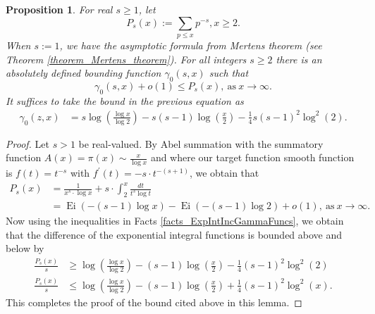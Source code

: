 \documentclass[11pt,reqno,a4letter]{article}
\numberwithin{figure}{section}
\numberwithin{table}{section}
\theoremstyle{plain}
\newtheorem{prop}[theorem]{Proposition}
\numberwithin{theorem}{section}
\theoremstyle{definition}
\newcommand{\NBRef}[1]{}
\begin{document}

\begin{prop} 
\label{cor_PartialSumsOfReciprocalsOfPrimePowers} 
For real $s \geq 1$, let 
\[
P_s(x) := \sum_{p \leq x} p^{-s}, x \geq 2. 
\]
When $s := 1$, we have the asymptotic formula from Mertens theorem 
(see Theorem \ref{theorem_Mertens_theorem}). 
For all integers $s \geq 2$ 
there is an absolutely defined bounding function $\gamma_0(s, x)$ such that 
\[
\gamma_0(s, x) + o(1) \leq P_s(x), \mathrm{\ as\ } x \rightarrow \infty. 
\] 
It suffices to take the bound in the previous equation as 
\begin{align*} 
\gamma_0(z, x) & = s\log\left(\frac{\log x}{\log 2}\right) - 
     s(s-1) \log\left(\frac{x}{2}\right) - 
     \frac{1}{4} s(s-1)^2 \log^2(2). 
\end{align*}
\end{prop} 
\NBRef{A05-2020-04-26} 
\begin{proof} 
Let $s > 1$ be real-valued. 
By Abel summation with the summatory function $A(x) = \pi(x) \sim \frac{x}{\log x}$ and where 
our target function smooth function is $f(t) = t^{-s}$ with 
$f^{\prime}(t) = -s \cdot t^{-(s+1)}$, we obtain that 
\begin{align*} 
P_s(x) & = \frac{1}{x^s \cdot \log x} + s \cdot \int_2^{x} \frac{dt}{t^s \log t} \\ 
     & = \operatorname{Ei}(-(s-1) \log x) - \operatorname{Ei}(-(s-1) \log 2) + o(1), 
     \mathrm{\ as\ } x \rightarrow \infty. 
\end{align*} 
Now using the inequalities in Facts \ref{facts_ExpIntIncGammaFuncs}, we obtain that the 
difference of the exponential integral functions is bounded above and below by 
\begin{align*} 
\frac{P_s(x)}{s} & \geq \log\left(\frac{\log x}{\log 2}\right) - (s-1) \log\left(\frac{x}{2}\right) - 
     \frac{1}{4} (s-1)^2 \log^2(2) \\ 
\frac{P_s(x)}{s} & \leq \log\left(\frac{\log x}{\log 2}\right) - (s-1) \log\left(\frac{x}{2}\right) + 
     \frac{1}{4} (s-1)^2 \log^2(x). 
\end{align*} 
This completes the proof of the bound cited above in this lemma. 
\end{proof} 
\end{document}
